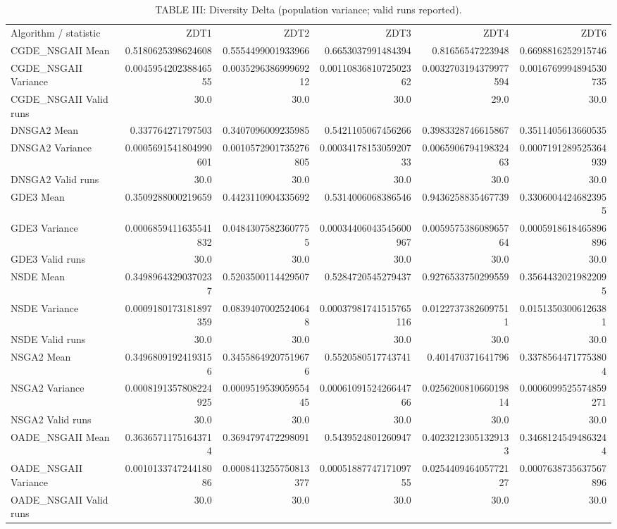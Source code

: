 \begin{table}[t]
\centering
\caption{TABLE III: Diversity Delta (population variance; valid runs reported).}
\begin{tabular}{lrrrrr}
\hline
Algorithm / statistic & ZDT1 & ZDT2 & ZDT3 & ZDT4 & ZDT6 \\
CGDE\_NSGAII Mean & 0.5180625398624608 & 0.5554499001933966 & 0.6653037991484394 & 0.81656547223948 & 0.6698816252915746 \\
CGDE\_NSGAII Variance & 0.004595420238846555 & 0.003529638699969212 & 0.0011083681072502362 & 0.0032703194379977594 & 0.0016769994894530735 \\
CGDE\_NSGAII Valid runs & 30.0 & 30.0 & 30.0 & 29.0 & 30.0 \\
DNSGA2 Mean & 0.337764271797503 & 0.3407096009235985 & 0.5421105067456266 & 0.3983328746615867 & 0.3511405613660535 \\
DNSGA2 Variance & 0.0005691541804990601 & 0.0010572901735276805 & 0.0003417815305920733 & 0.006590679419832463 & 0.0007191289525364939 \\
DNSGA2 Valid runs & 30.0 & 30.0 & 30.0 & 30.0 & 30.0 \\
GDE3 Mean & 0.3509288000219659 & 0.4423110904335692 & 0.5314006068386546 & 0.9436258835467739 & 0.33060044246823955 \\
GDE3 Variance & 0.0006859411635541832 & 0.04843075823607755 & 0.00034406043545600967 & 0.005957538608965764 & 0.0005918618465896896 \\
GDE3 Valid runs & 30.0 & 30.0 & 30.0 & 30.0 & 30.0 \\
NSDE Mean & 0.34989643290370237 & 0.5203500114429507 & 0.5284720545279437 & 0.9276533750299559 & 0.35644320219822095 \\
NSDE Variance & 0.0009180173181897359 & 0.08394070025240648 & 0.00037981741515765116 & 0.01227373826097511 & 0.01513503006126381 \\
NSDE Valid runs & 30.0 & 30.0 & 30.0 & 30.0 & 30.0 \\
NSGA2 Mean & 0.34968091924193156 & 0.34558649207519676 & 0.5520580517743741 & 0.401470371641796 & 0.33785644717753804 \\
NSGA2 Variance & 0.0008191357808224925 & 0.000951953905955445 & 0.0006109152426644766 & 0.025620081066019814 & 0.0006099525574859271 \\
NSGA2 Valid runs & 30.0 & 30.0 & 30.0 & 30.0 & 30.0 \\
OADE\_NSGAII Mean & 0.36365711751643714 & 0.3694797472298091 & 0.5439524801260947 & 0.40232123051329133 & 0.34681245494863244 \\
OADE\_NSGAII Variance & 0.001013374724418086 & 0.0008413255750813377 & 0.0005188774717109755 & 0.025440946405772127 & 0.0007638735637567896 \\
OADE\_NSGAII Valid runs & 30.0 & 30.0 & 30.0 & 30.0 & 30.0 \\
\hline
\end{tabular}
\end{table}